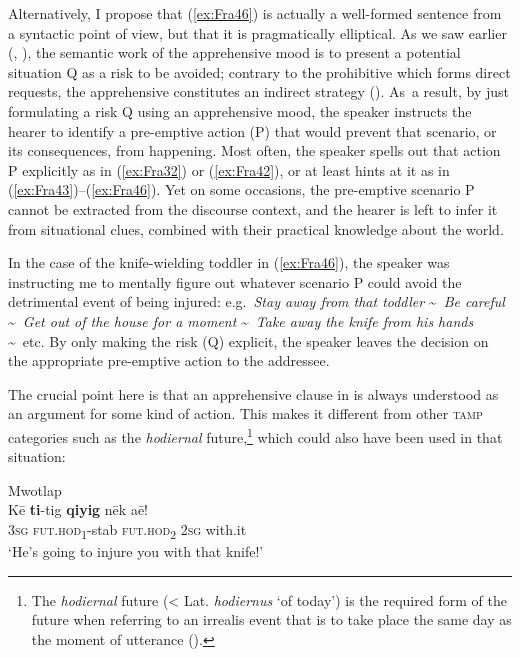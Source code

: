 \documentclass[output=paper,colorlinks,citecolor=brown]{langscibook}
\begin{document}
Alternatively, I propose that (\ref{ex:Fra46}) is actually a well-formed sentence from a syntactic point of view, but that it is pragmatically elliptical. As we saw earlier (, ), the semantic work of the apprehensive mood is to present a potential situation Q as a risk to be avoided; contrary to the prohibitive which forms direct requests, the apprehensive constitutes an indirect strategy (). As~a result, by just formulating a risk Q using an apprehensive mood, the speaker instructs the hearer to identify a pre-emptive action (P) that would prevent that scenario, or its consequences, from happening. Most often, the speaker spells out that action P explicitly as in (\ref{ex:Fra32}) or (\ref{ex:Fra42}), or at least hints at it as in (\ref{ex:Fra43})--(\ref{ex:Fra46}). Yet on some occasions, the pre-emptive scenario P cannot be extracted from the discourse context, and the hearer is left to infer it from situational clues, combined with their practical knowledge about the world.


In the case of the knife-wielding toddler in (\ref{ex:Fra46}), the speaker was instructing me to mentally figure out whatever scenario P could avoid the detrimental event of being injured: e.g.\ \textit{Stay away from that toddler} \textasciitilde\ \textit{Be careful} \textasciitilde\ \textit{Get out of the house for a moment} \textasciitilde\ \textit{Take away the knife from his hands} \textasciitilde\ etc. By only making the risk (Q) explicit, the speaker leaves the decision on the appropriate pre-emptive action to the addressee.



The crucial point here is that an apprehensive clause in  is always understood as an argument for some kind of action. This makes it different from other \textsc{tamp} categories such as the \textit{hodiernal} future,\footnote{The \textit{hodiernal} future (< Lat. \textit{hodiernus} `of today') is the required form of the future when referring to an irrealis event that is to take place the same day as the moment of utterance (\citealt[258--269]{francois2003}).} which could also have been used in that situation:

\newpage
\ea \label{ex:Fra47} \textnormal{Mwotlap} \\
\gll Kē \textbf{ti}-tig \textbf{qiyig} nēk aē! \\
\textsc{3sg} \textsc{fut.hod}\textsubscript{1}-stab \textsc{fut.hod}\textsubscript{2} \textsc{2sg} with.it \\
\glt `He's going to injure you with that knife!'
\z
\end{document}
